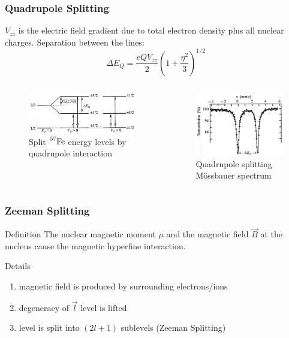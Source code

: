 	\begin{frame}
		\frametitle{Quadrupole Splitting}
		$V_{zz}$ is the electric field gradient due to total electron density plus all nuclear charges. Separation between the lines:
		\begin{equation*}
			\Delta E_Q=\frac{e Q V_{zz}}{2} \left( 1 + \frac{\eta^2}{3} \right)^{1/2}
		\end{equation*}
		
		\vspace{-0.6cm}
		\begin{columns}
			\begin{column}{0.49\textwidth}
				\begin{figure}
					\centering
					\includegraphics[width=6cm]{images/quadrupole-splitting.jpg}
					\caption{Split $\ce{^{57}Fe}$ energy levels by quadrupole interaction}
				\end{figure}
			\end{column}
			\begin{column}{0.49\textwidth}
				\begin{figure}
					\centering
					\includegraphics[width=5cm]{images/quadrupole-splitting-spectrum.jpg}
					\caption{Quadrupole splitting Mössbauer spectrum}
				\end{figure}
			\end{column}
		\end{columns}
	\end{frame}

	\begin{frame}
		\frametitle{Zeeman Splitting}
		\begin{block}{Definition}
			The nuclear magnetic moment $\mu$ and the magnetic field $\vec{B}$ at the nucleus cause the magnetic hyperfine interaction.
		\end{block}
		\begin{block}{Details}
			\begin{enumerate}
				\item magnetic field is produced by surrounding electrons/ions
				\item degeneracy of $\vec{l}$ level is lifted
				\item level is split into $(2l+1)$ sublevels (Zeeman Splitting)
			\end{enumerate}
		\end{block}
	\end{frame}

